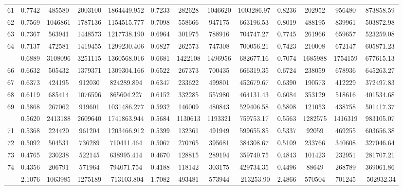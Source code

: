 \documentclass[
  12pt,
]{article}
\begin{document}
\begin{longtable}[t]{lcccccccccccc}
61 & 0.7742 & 485580 & 2003100 & 1864449.952 & 0.7233 & 282628 & 1046620 & 1003286.97 & 0.8236 & 202952 & 956480 & 873858.59\\
62 & 0.7569 & 1046861 & 1787136 & 1154515.777 & 0.7098 & 558666 & 947175 & 663196.53 & 0.8019 & 488195 & 839961 & 503872.98\\
63 & 0.7367 & 563941 & 1448573 & 1217738.190 & 0.6964 & 301975 & 788916 & 704747.27 & 0.7745 & 261966 & 659657 & 523259.08\\
64 & 0.7137 & 472581 & 1419455 & 1299230.406 & 0.6827 & 262573 & 747308 & 700056.21 & 0.7423 & 210008 & 672147 & 605871.23\\
\addlinespace
65 & 0.6889 & 3108096 & 3251115 & 1360568.016 & 0.6681 & 1422108 & 1496956 & 682677.16 & 0.7074 & 1685988 & 1754159 & 677615.13\\
66 & 0.6632 & 505432 & 1379371 & 1309304.166 & 0.6522 & 267373 & 700435 & 666319.35 & 0.6724 & 238059 & 678936 & 645263.27\\
67 & 0.6373 & 424195 & 912030 & 824289.894 & 0.6347 & 233622 & 499801 & 452679.67 & 0.6390 & 190573 & 412229 & 372497.83\\
68 & 0.6119 & 685414 & 1076596 & 865604.227 & 0.6152 & 332285 & 557980 & 464131.43 & 0.6084 & 353129 & 518616 & 401534.68\\
69 & 0.5868 & 267062 & 919601 & 1031486.277 & 0.5932 & 146009 & 480843 & 529406.58 & 0.5808 & 121053 & 438758 & 501417.37\\
\addlinespace
70 & 0.5620 & 2413188 & 2609640 & 1741863.944 & 0.5684 & 1130613 & 1193321 & 759753.17 & 0.5563 & 1282575 & 1416319 & 983105.07\\
71 & 0.5368 & 224420 & 961204 & 1203466.912 & 0.5399 & 132361 & 491949 & 599655.85 & 0.5337 & 92059 & 469255 & 603656.38\\
72 & 0.5092 & 504531 & 736289 & 710411.464 & 0.5067 & 270765 & 395681 & 384308.67 & 0.5109 & 233766 & 340608 & 327046.64\\
73 & 0.4765 & 230238 & 522145 & 638995.414 & 0.4670 & 128815 & 289194 & 359740.75 & 0.4843 & 101423 & 232951 & 281707.21\\
74 & 0.4356 & 206791 & 571964 & 794071.754 & 0.4188 & 118142 & 303175 & 429734.35 & 0.4496 & 88649 & 268789 & 369061.86\\
\addlinespace
75 & 2.1076 & 1063985 & 1275189 & -713103.804 & 1.7082 & 493481 & 573944 & -213253.90 & 2.4866 & 570504 & 701245 & -502932.34\\*
\end{longtable}
\endgroup{}
\end{document}
